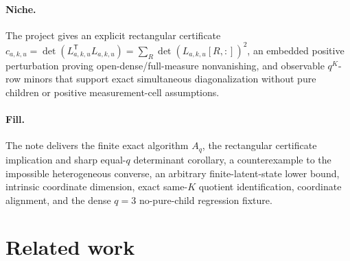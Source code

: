 \documentclass{article}
\begin{document}
\paragraph{Niche.} The project gives an explicit rectangular certificate \(c_{a,k,u}=\det(L_{a,k,u}^{\mathsf T}L_{a,k,u})=\sum_R\det(L_{a,k,u}[R,:])^2\), an embedded positive perturbation proving open-dense/full-measure nonvanishing, and observable \(q^K\)-row minors that support exact simultaneous diagonalization without pure children or positive measurement-cell assumptions.

\paragraph{Fill.} The note delivers the finite exact algorithm \(A_q\), the rectangular certificate implication and sharp equal-\(q\) determinant corollary, a counterexample to the impossible heterogeneous converse, an arbitrary finite-latent-state lower bound, intrinsic coordinate dimension, exact same-\(K\) quotient identification, coordinate alignment, and the dense \(q=3\) no-pure-child regression fixture.

\section{Related work}
\end{document}
